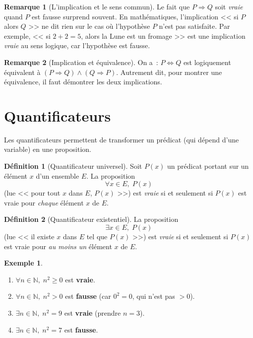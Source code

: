 \documentclass[12pt,a4paper,openany]{book}
\theoremstyle{definition}
\newtheorem{definition}{Définition}[chapter]
\newtheorem{remarque}{Remarque}[chapter]
\newtheorem{exemple}{Exemple}[chapter]
\newcommand{\N}{\mathbb{N}}
\begin{document}
\begin{remarque}[L'implication et le sens commun]\label{rem:impl-sens}
  Le fait que $P \Rightarrow Q$ soit \emph{vraie} quand $P$ est fausse surprend souvent. En mathématiques, l'implication << si $P$ alors $Q$ >> ne dit rien sur le cas où l'hypothèse $P$ n'est pas satisfaite. Par exemple, << si $2+2=5$, alors la Lune est un fromage >> est une implication \emph{vraie} au sens logique, car l'hypothèse est fausse.
\end{remarque}

\begin{remarque}[Implication et équivalence]\label{rem:impl-equiv}
  On a~: $P \Leftrightarrow Q$ est logiquement équivalent à $(P \Rightarrow Q) \land (Q \Rightarrow P)$. Autrement dit, pour montrer une équivalence, il faut démontrer les deux implications.
\end{remarque}


\section{Quantificateurs}
\label{sec:quantificateurs}

Les quantificateurs permettent de transformer un prédicat (qui dépend d'une variable) en une proposition.

\begin{definition}[Quantificateur universel]\label{def:quant-univ}
  Soit $P(x)$ un prédicat portant sur un élément $x$ d'un ensemble $E$. La proposition
  \[
    \forall x \in E,\; P(x)
  \]
  (lue << pour tout $x$ dans $E$, $P(x)$ >>) est \emph{vraie} si et seulement si $P(x)$ est vraie pour \emph{chaque} élément $x$ de $E$.
\end{definition}

\begin{definition}[Quantificateur existentiel]\label{def:quant-exist}
  La proposition
  \[
    \exists x \in E,\; P(x)
  \]
  (lue << il existe $x$ dans $E$ tel que $P(x)$ >>) est \emph{vraie} si et seulement si $P(x)$ est vraie pour \emph{au moins un} élément $x$ de $E$.
\end{definition}

\begin{exemple}\label{ex:quant-ex}
  \begin{enumerate}[label=(\alph*)]
    \item $\forall n \in \N,\; n^2 \geq 0$ est \textbf{vraie}.
    \item $\forall n \in \N,\; n^2 > 0$ est \textbf{fausse} (car $0^2 = 0$, qui n'est pas $> 0$).
    \item $\exists n \in \N,\; n^2 = 9$ est \textbf{vraie} (prendre $n = 3$).
    \item $\exists n \in \N,\; n^2 = 7$ est \textbf{fausse}.
  \end{enumerate}
\end{exemple}
\end{document}
